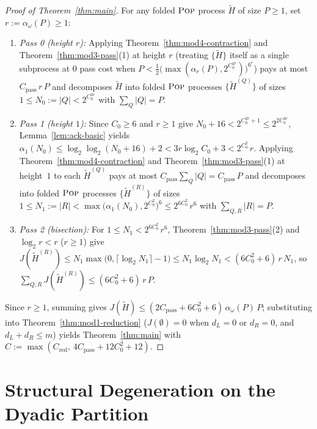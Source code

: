 \documentclass[11pt]{article}
\theoremstyle{definition}
\theoremstyle{remark}
\newcommand{\POP}{\textnormal{\scshape Pop}}
\begin{document}
\begin{proof}[Proof of Theorem~\ref{thm:main}]
For any folded $\POP$ process $\widetilde{H}$ of size $P \ge 1$, set $r := \alpha_\omega(P) \ge 1$:
\begin{enumerate}[label=(\arabic*)]
  \item \emph{Pass 0 (height $r$):} Applying Theorem~\ref{thm:mod4-contraction} and Theorem~\ref{thm:mod3-pass}(1) at height $r$ (treating $\{\widetilde{H}\}$ itself as a single subprocess at $0$ pass cost when $P < \frac{1}{2}\big(\max(\alpha_r(P), 2^{C_0^{2r}})\big)^{6^r}$) pays at most $C_{\mathrm{pass}}\,r\,P$ and decomposes $\widetilde{H}$ into folded $\POP$ processes $\{\widetilde{H}^{(Q)}\}$ of sizes $1 \le N_0 := |Q| < 2^{C_0^{3r}}$ with $\sum_Q |Q| = P$.
  \item \emph{Pass 1 (height $1$):} Since $C_0 \ge 6$ and $r \ge 1$ give $N_0 + 16 < 2^{C_0^{3r} + 1} \le 2^{2 C_0^{3r}}$, Lemma~\ref{lem:ack-basic} yields $\alpha_1(N_0) \le \log_2\log_2(N_0 + 16) + 2 < 3 r \log_2 C_0 + 3 < 2^{C_0^2}\,r$. Applying Theorem~\ref{thm:mod4-contraction} and Theorem~\ref{thm:mod3-pass}(1) at height~$1$ to each $\widetilde{H}^{(Q)}$ pays at most $C_{\mathrm{pass}}\sum_Q |Q| = C_{\mathrm{pass}}\,P$ and decomposes into folded $\POP$ processes $\{\widetilde{H}^{(R)}\}$ of sizes $1 \le N_1 := |R| < \max\big(\alpha_1(N_0), 2^{C_0^2}\big)^6 \le 2^{6 C_0^2}\,r^6$ with $\sum_{Q, R} |R| = P$.
  \item \emph{Pass 2 (bisection):} For $1 \le N_1 < 2^{6 C_0^2}\,r^6$, Theorem~\ref{thm:mod3-pass}(2) and $\log_2 r < r$ ($r \ge 1$) give $J(\widetilde{H}^{(R)}) \le N_1 \max\big(0, \lceil \log_2 N_1 \rceil - 1\big) \le N_1 \log_2 N_1 < (6 C_0^2 + 6)\,r\,N_1$, so $\sum_{Q, R} J(\widetilde{H}^{(R)}) \le (6 C_0^2 + 6)\,r\,P$.
\end{enumerate}
Since $r \ge 1$, summing gives $J(\widetilde{H}) \le (2 C_{\mathrm{pass}} + 6 C_0^2 + 6)\,\alpha_\omega(P)\,P$; substituting into Theorem~\ref{thm:mod1-reduction} ($J(\emptyset) = 0$ when $d_L = 0$ or $d_R = 0$, and $d_L + d_R \le m$) yields Theorem~\ref{thm:main} with $C := \max(C_{\mathrm{red}},\, 4 C_{\mathrm{pass}} + 12 C_0^2 + 12)$.
\end{proof}




\section{Structural Degeneration on the Dyadic Partition}
\label{sec:frontiers}
\end{document}
